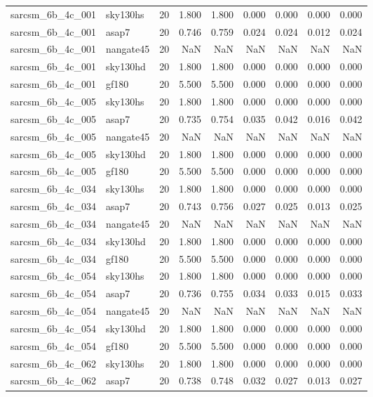 \begin{tabular}{llrrrrrrr}
sarcsm\_6b\_4c\_001 & sky130hs & 20 & 1.800 & 1.800 & 0.000 & 0.000 & 0.000 & 0.000 \\
sarcsm\_6b\_4c\_001 & asap7 & 20 & 0.746 & 0.759 & 0.024 & 0.024 & 0.012 & 0.024 \\
sarcsm\_6b\_4c\_001 & nangate45 & 20 & NaN & NaN & NaN & NaN & NaN & NaN \\
sarcsm\_6b\_4c\_001 & sky130hd & 20 & 1.800 & 1.800 & 0.000 & 0.000 & 0.000 & 0.000 \\
sarcsm\_6b\_4c\_001 & gf180 & 20 & 5.500 & 5.500 & 0.000 & 0.000 & 0.000 & 0.000 \\
sarcsm\_6b\_4c\_005 & sky130hs & 20 & 1.800 & 1.800 & 0.000 & 0.000 & 0.000 & 0.000 \\
sarcsm\_6b\_4c\_005 & asap7 & 20 & 0.735 & 0.754 & 0.035 & 0.042 & 0.016 & 0.042 \\
sarcsm\_6b\_4c\_005 & nangate45 & 20 & NaN & NaN & NaN & NaN & NaN & NaN \\
sarcsm\_6b\_4c\_005 & sky130hd & 20 & 1.800 & 1.800 & 0.000 & 0.000 & 0.000 & 0.000 \\
sarcsm\_6b\_4c\_005 & gf180 & 20 & 5.500 & 5.500 & 0.000 & 0.000 & 0.000 & 0.000 \\
sarcsm\_6b\_4c\_034 & sky130hs & 20 & 1.800 & 1.800 & 0.000 & 0.000 & 0.000 & 0.000 \\
sarcsm\_6b\_4c\_034 & asap7 & 20 & 0.743 & 0.756 & 0.027 & 0.025 & 0.013 & 0.025 \\
sarcsm\_6b\_4c\_034 & nangate45 & 20 & NaN & NaN & NaN & NaN & NaN & NaN \\
sarcsm\_6b\_4c\_034 & sky130hd & 20 & 1.800 & 1.800 & 0.000 & 0.000 & 0.000 & 0.000 \\
sarcsm\_6b\_4c\_034 & gf180 & 20 & 5.500 & 5.500 & 0.000 & 0.000 & 0.000 & 0.000 \\
sarcsm\_6b\_4c\_054 & sky130hs & 20 & 1.800 & 1.800 & 0.000 & 0.000 & 0.000 & 0.000 \\
sarcsm\_6b\_4c\_054 & asap7 & 20 & 0.736 & 0.755 & 0.034 & 0.033 & 0.015 & 0.033 \\
sarcsm\_6b\_4c\_054 & nangate45 & 20 & NaN & NaN & NaN & NaN & NaN & NaN \\
sarcsm\_6b\_4c\_054 & sky130hd & 20 & 1.800 & 1.800 & 0.000 & 0.000 & 0.000 & 0.000 \\
sarcsm\_6b\_4c\_054 & gf180 & 20 & 5.500 & 5.500 & 0.000 & 0.000 & 0.000 & 0.000 \\
sarcsm\_6b\_4c\_062 & sky130hs & 20 & 1.800 & 1.800 & 0.000 & 0.000 & 0.000 & 0.000 \\
sarcsm\_6b\_4c\_062 & asap7 & 20 & 0.738 & 0.748 & 0.032 & 0.027 & 0.013 & 0.027 \\

\end{tabular}
